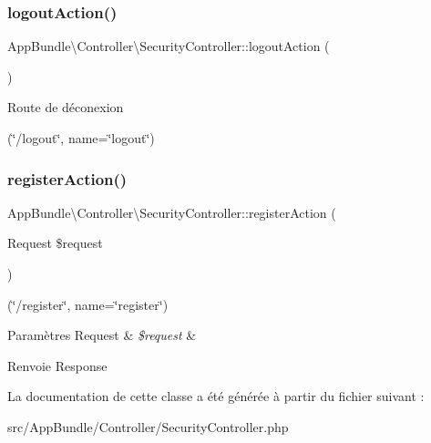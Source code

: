 \subsubsection{\texorpdfstring{logout\+Action()}{logoutAction()}}
{\footnotesize\ttfamily App\+Bundle\textbackslash{}\+Controller\textbackslash{}\+Security\+Controller\+::logout\+Action (\begin{DoxyParamCaption}{ }\end{DoxyParamCaption})}

Route de déconexion

(\char`\"{}/logout\char`\"{}, name=\char`\"{}logout\char`\"{}) \mbox{\label{classAppBundle_1_1Controller_1_1SecurityController_ac211800b0754333fd74c47600d369aad}} 
\subsubsection{\texorpdfstring{register\+Action()}{registerAction()}}
{\footnotesize\ttfamily App\+Bundle\textbackslash{}\+Controller\textbackslash{}\+Security\+Controller\+::register\+Action (\begin{DoxyParamCaption}\item[{Request}]{\$request }\end{DoxyParamCaption})}

(\char`\"{}/register\char`\"{}, name=\char`\"{}register\char`\"{}) 
\begin{DoxyParams}[1]{Paramètres}
Request & {\em \$request} & \\
\hline
\end{DoxyParams}
\begin{DoxyReturn}{Renvoie}
Response 
\end{DoxyReturn}


La documentation de cette classe a été générée à partir du fichier suivant \+:\begin{DoxyCompactItemize}
\item 
src/\+App\+Bundle/\+Controller/Security\+Controller.\+php\end{DoxyCompactItemize}
